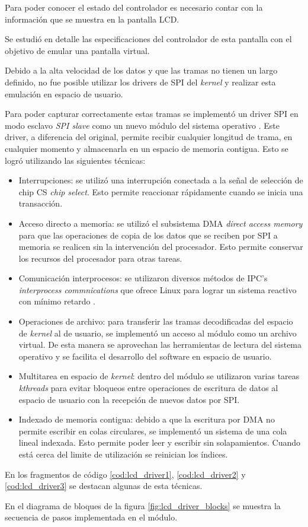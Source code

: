       Para poder conocer el estado del controlador es necesario contar con la información que se muestra en la pantalla LCD.\par
      Se estudió en detalle las especificaciones del controlador de esta pantalla con el objetivo de emular una pantalla virtual.\par
      Debido a la alta velocidad de los datos y que las tramas no tienen un largo definido, no fue posible utilizar los drivers de SPI del \textit{kernel} y realizar esta emulación en espacio de usuario.\par
      Para poder capturar correctamente estas tramas se implementó un driver SPI en modo esclavo \textit{SPI slave} como un nuevo módulo del sistema operativo \citep{ldd3}.
      Este driver, a diferencia del original, permite recibir cualquier longitud de trama, en cualquier momento y almacenarla en un espacio de memoria contigua.
      Esto se logró utilizando las siguientes técnicas:
      \begin{itemize}
         \item {Interrupciones: se utilizó una interrupción conectada a la señal de selección de chip CS \textit{chip select}. Esto permite reaccionar rápidamente cuando se inicia una transacción.}
         \item {Acceso directo a memoria: se utilizó el subsistema DMA \textit{direct access memory} para que las operaciones de copia de los datos que se reciben por SPI a memoria se realicen sin la intervención del procesador. Esto permite conservar los recursos del procesador para otras tareas.}
         \item{Comunicación interprocesos: se utilizaron diversos métodos de IPC's \textit{interprocess commnications} que ofrece Linux para lograr un sistema reactivo con mínimo retardo \citep{ldd3}.}
         \item{Operaciones de archivo: para transferir las tramas decodificadas del espacio de \textit{kernel} al de usuario, se implementó un acceso al módulo como un archivo virtual. De esta manera se aprovechan las herramientas de lectura del sistema operativo y se facilita el desarrollo del software en espacio de usuario.}
         \item{Multitarea en espacio de \textit{kernel}: dentro del módulo se utilizaron varias tareas \textit{kthreads} para evitar bloqueos entre operaciones de escritura de datos al espacio de usuario con la recepción de nuevos datos por SPI.}
         \item{Indexado de memoria contigua: debido a que la escritura por DMA no permite escribir en colas circulares, se implementó un sistema de una cola lineal indexada. Esto permite poder leer y escribir sin solapamientos. Cuando está cerca del limite de utilización se reinician los índices.}
      \end{itemize}
      En los fragmentos de código \ref{cod:lcd_driver1}, \ref{cod:lcd_driver2} y \ref{cod:lcd_driver3} se destacan algunas de esta técnicas.\par
      En el diagrama de bloques de la figura \ref{fig:lcd_driver_blocks} se muestra la secuencia de pasos implementada en el módulo.
      
